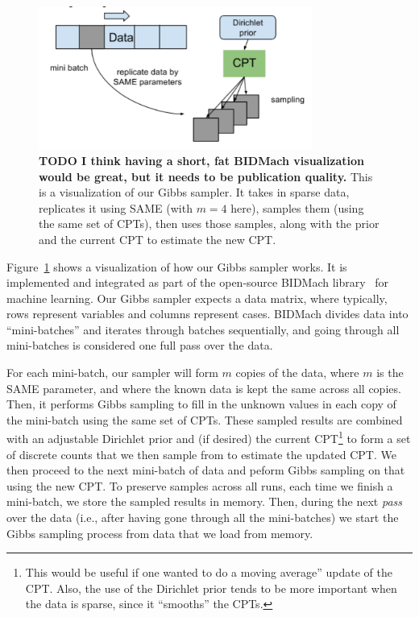 \documentclass{article} %
\begin{document}
\begin{figure}[t]
\centering
\includegraphics[width=0.8\textwidth]{fig_BIDMach_flow_DRAFT}
\caption{\textbf{TODO I think having a short, fat BIDMach visualization would be great, but it needs
to be publication quality.} This is a visualization of our Gibbs sampler. It takes in sparse data,
replicates it using SAME (with $m=4$ here), samples them (using the same set of CPTs), then uses
those samples, along with the prior and the current CPT to estimate the new CPT.}
\label{fig:BIDMach}
\end{figure}

Figure~\ref{fig:BIDMach} shows a visualization of how our Gibbs sampler works. It is implemented and
integrated as part of the open-source BIDMach library~\citep{bidmach} for machine learning. Our
Gibbs sampler expects a data matrix, where typically, rows represent variables and columns represent
cases. BIDMach divides data into ``mini-batches'' and iterates through batches sequentially, and
going through all mini-batches is considered one full pass over the data.

For each mini-batch, our sampler will form $m$ copies of the data, where $m$ is the SAME parameter,
and where the known data is kept the same across all copies. Then, it performs Gibbs sampling to
fill in the unknown values in each copy of the mini-batch using the same set of CPTs.  These sampled
results are combined with an adjustable Dirichlet prior and (if desired) the current
CPT\footnote{This would be useful if one wanted to do a moving average'' update of the CPT. Also,
the use of the Dirichlet prior tends to be more important when the data is sparse, since it
``smooths'' the CPTs.} to form a set of discrete counts that we then sample from to estimate the
updated CPT. We then proceed to the next mini-batch of data and peform Gibbs sampling on that using
the new CPT. To preserve samples across all runs, each time we finish a mini-batch, we store the
sampled results in memory. Then, during the next \emph{pass} over the data (i.e., after having gone
through all the mini-batches) we start the Gibbs sampling process from data that we load from
memory.
\end{document}

